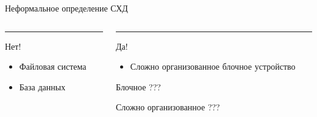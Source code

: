 \documentclass[aspectratio=169]{beamer}
\begin{document}
\begin{frame}{Неформальное определение СХД}
    \begin{columns}[T] %
    \begin{column}{.48\textwidth}
    \color{red}\rule{\linewidth}{4pt}
    
    Нет!
    \begin{itemize}
        \item Файловая система
        \item База данных
    \end{itemize}
    \end{column}%
    \hfill%
    \begin{column}{.48\textwidth}
    \color{blue}\rule{\linewidth}{4pt}
    
    Да!
    \begin{itemize}
        \item Сложно организованное блочное устройство
    \end{itemize}
    
    \color{black}
    \vspace{4em}
    Блочное ???

    Сложно организованное ???
    \end{column}%
    \end{columns}
        
    




\end{frame}
\end{document}
